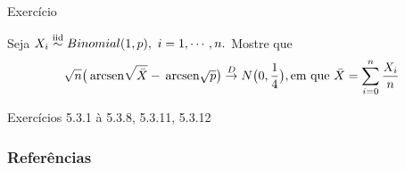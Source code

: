\documentclass[12pt]{beamer}
\begin{document}
\begin{frame}{Exercício}
\begin{block}{\Home}
\justifying
Seja $X_{i}\overset{\text{iid}}{\sim} Binomial(1,p),~ i=1,\cdots,n.$ Mostre que 
\begin{align*}
    \sqrt{n}\big(\hspace{2pt}\textrm{arcsen}{\sqrt{\bar{X}}}-\hspace{2pt}\textrm{arcsen}{\sqrt{p}}\big)\overset{D}{\rightarrow} N\big(0,\dfrac{1}{4}\big), \text{em que}~\bar{X}=\displaystyle{\sum_{i=0}^{n}\dfrac{X_{i}}{n}}
\end{align*}
\end{block}
\nocite{casella2021statistical} \nocite{hogg}
\end{frame}

\begin{frame}{}
\begin{block}{\Home}
\justifying
Exercícios 5.3.1 à 5.3.8, 5.3.11, 5.3.12
\end{block}
\end{frame}


\begin{frame}[allowframebreaks]
\frametitle{\bf Referências}
\printbibliography
\end{frame}
\end{document}
